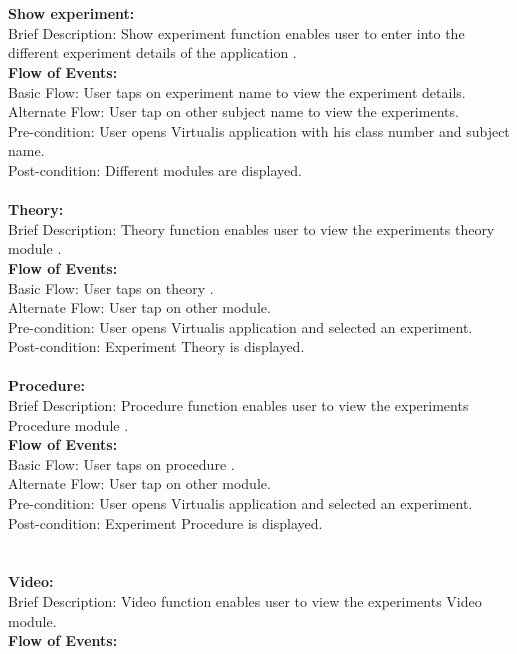 \documentclass[12pt]{report}
\begin{document}
\\
\\
\textbf{Show experiment: }\\
Brief Description: Show experiment  function enables user to enter into the different  experiment details of the application . \\
\textbf{Flow of Events: }\\
\indent	 Basic Flow: User taps on experiment name to view the experiment details.\\ 
\indent	Alternate Flow: User  tap on other subject name to view the experiments. \\
Pre-condition: User opens Virtualis application with his class number and subject name.\\ 
Post-condition: Different modules are displayed. 
\\
\\
\textbf{Theory:} \\
Brief Description: Theory function enables user to view the experiments theory module .\\ 
\textbf{Flow of Events:} \\
\indent	 Basic Flow: User taps on theory . \\
\indent	Alternate Flow: User  tap on other module. \\
Pre-condition: User opens Virtualis application and selected an experiment. \\
Post-condition: Experiment Theory is displayed. 
\\
\\
\textbf{Procedure: }\\
Brief Description: Procedure function enables user to view the experiments Procedure module . \\
\textbf{Flow of Events: }\\
\indent	 Basic Flow: User taps on procedure . \\
\indent	Alternate Flow: User  tap on other module. \\
Pre-condition: User opens Virtualis application and selected an experiment.\\ 
Post-condition: Experiment Procedure is displayed.\\ 
\\
\\
\textbf{Video: }\\
Brief Description: Video  function enables user to view the experiments Video module.\\
\textbf{Flow of Events:} \\
\end{document}
